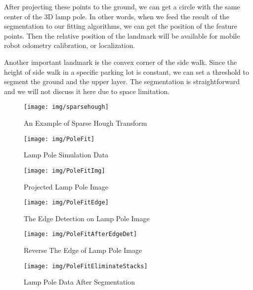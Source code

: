 \documentclass[twocolumn]{IEEEtran}
\begin{document}
After projecting these points to the ground, we can get a circle with the same center of the 3D lamp pole. In other words, when we feed the result of the segmentation to our fitting algorithms, we can get the position of the feature points. Then the relative position of the landmark will be available for mobile robot odometry calibration, or localization. 

Another important landmark is the convex corner of the side walk. Since the height of side walk in a specific parking lot is constant, we can set a threshold to segment the ground and the upper layer. The segmentation is straightforward and  we will not discuss it here due to space limitation. 

\begin{figure}
\begin{minipage}[t]{0.23\textwidth}
    \centering
    \texttt{[image: img/sparsehough]}
    \caption{An Example of Sparse Hough Transform} \label{fig:spht}
\end{minipage}
\begin{minipage}[t]{0.23\textwidth}
    \centering
    \centering\texttt{[image: img/PoleFit]}
     \caption{Lamp Pole Simulation Data} \label{fig:polefit}
\end{minipage}
\end{figure}

\begin{figure}[!htb]
    \begin{minipage}[t]{0.23\textwidth}
       \centering\texttt{[image: img/PoleFitImg]}
       \caption{Projected Lamp Pole Image} \label{fig:polefitimg} 
    \end{minipage} %
    \begin{minipage}[t]{0.23\textwidth}
        \centering\texttt{[image: img/PoleFitEdge]}
        \caption{The Edge Detection on Lamp Pole Image} \label{fig:polefitedge}
    \end{minipage}
\end{figure}

\begin{figure}[!htb]
    \begin{minipage}[t]{0.23\textwidth}
        \centering\texttt{[image: img/PoleFitAfterEdgeDet]}
        \caption{Reverse The Edge of Lamp Pole Image} \label{fig:polefitafteredgedet}
    \end{minipage} %
    \begin{minipage}[t]{0.23\textwidth}
        \center\texttt{[image: img/PoleFitEliminateStacks]} 
        \caption{Lamp Pole Data After Segmentation} \label{fig:polefitElm}
    \end{minipage}
\end{figure}
\end{document}
